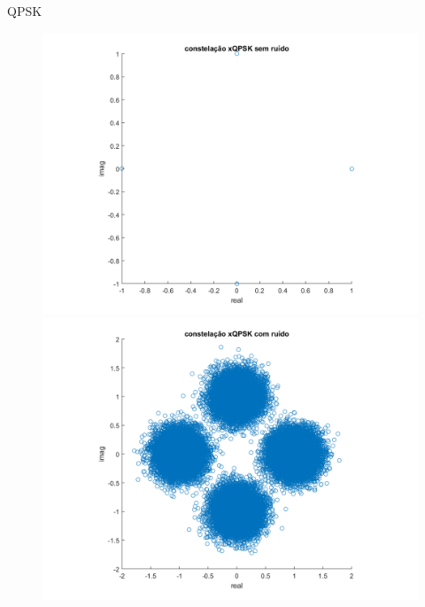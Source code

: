 ﻿\documentclass[mathserif]{beamer}
\begin{document}
	\begin{frame}{QPSK}
		\begin{figure}
			\centering
			\includegraphics[scale=0.3]{../NossoCodigo2/figuras/modula2.png}
			\includegraphics[scale=0.3]{../NossoCodigo2/figuras/modula8.png}
		\end{figure}
	\end{frame}
\end{document}
